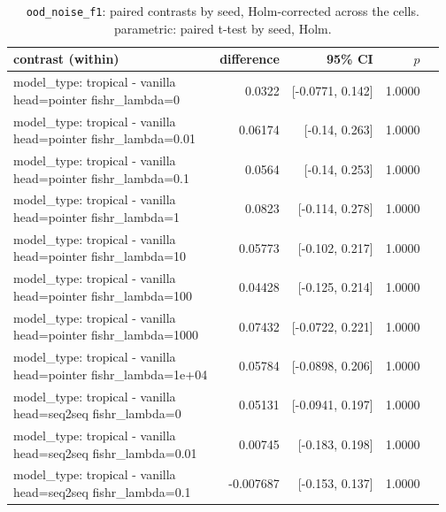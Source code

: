 \documentclass[10pt]{article}
\makeatletter
\newcommand{\stackcell}[1]{\begin{tabular}[t]{@{}l@{}}#1\end{tabular}}
\makeatother
\begin{document}
{\small
\begin{longtable}{lrrrl}
\caption{\texttt{ood\_noise\_f1}: paired contrasts by seed, Holm-corrected across the cells. parametric: paired t-test by seed, Holm.}\label{tab:paired-ood_noise_f1}\\
\toprule
contrast (within) & difference & 95\% CI & $p$ & \\
\midrule
\endhead
\stackcell{model\_type: tropical - vanilla\\\footnotesize head=pointer fishr\_lambda=0 } & 0.0322 & [-0.0771, 0.142] & 1.0000 & \\
\stackcell{model\_type: tropical - vanilla\\\footnotesize head=pointer fishr\_lambda=0.01 } & 0.06174 & [-0.14, 0.263] & 1.0000 & \\
\stackcell{model\_type: tropical - vanilla\\\footnotesize head=pointer fishr\_lambda=0.1 } & 0.0564 & [-0.14, 0.253] & 1.0000 & \\
\stackcell{model\_type: tropical - vanilla\\\footnotesize head=pointer fishr\_lambda=1 } & 0.0823 & [-0.114, 0.278] & 1.0000 & \\
\stackcell{model\_type: tropical - vanilla\\\footnotesize head=pointer fishr\_lambda=10 } & 0.05773 & [-0.102, 0.217] & 1.0000 & \\
\stackcell{model\_type: tropical - vanilla\\\footnotesize head=pointer fishr\_lambda=100 } & 0.04428 & [-0.125, 0.214] & 1.0000 & \\
\stackcell{model\_type: tropical - vanilla\\\footnotesize head=pointer fishr\_lambda=1000 } & 0.07432 & [-0.0722, 0.221] & 1.0000 & \\
\stackcell{model\_type: tropical - vanilla\\\footnotesize head=pointer fishr\_lambda=1e+04 } & 0.05784 & [-0.0898, 0.206] & 1.0000 & \\
\stackcell{model\_type: tropical - vanilla\\\footnotesize head=seq2seq fishr\_lambda=0 } & 0.05131 & [-0.0941, 0.197] & 1.0000 & \\
\stackcell{model\_type: tropical - vanilla\\\footnotesize head=seq2seq fishr\_lambda=0.01 } & 0.00745 & [-0.183, 0.198] & 1.0000 & \\
\stackcell{model\_type: tropical - vanilla\\\footnotesize head=seq2seq fishr\_lambda=0.1 } & -0.007687 & [-0.153, 0.137] & 1.0000 & \\

\end{longtable}}
\end{document}
